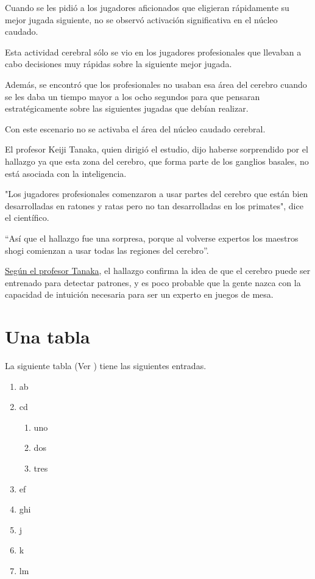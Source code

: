 \documentclass[12pt,a4paper]{article}
\begin{document}
Cuando se les pidió a los jugadores aficionados que eligieran rápidamente su mejor jugada siguiente, no se observó activación significativa en el núcleo caudado.

Esta actividad cerebral sólo se vio en los jugadores profesionales que llevaban a cabo decisiones muy rápidas sobre la siguiente mejor jugada.

Además, se encontró que los profesionales no usaban esa área del cerebro cuando se les daba un tiempo mayor a los ocho segundos para que pensaran estratégicamente sobre las siguientes jugadas que debían realizar.

Con este escenario no se activaba el área del núcleo caudado cerebral.

{\color{red} El profesor Keiji Tanaka, quien dirigió el estudio, dijo haberse sorprendido por el hallazgo ya que esta zona del cerebro, que forma parte de los ganglios basales, no está asociada con la inteligencia.}

"Los jugadores profesionales comenzaron a usar partes del cerebro que están bien desarrolladas en ratones y ratas pero no tan desarrolladas en los primates", dice el científico.

``Así que el hallazgo fue una sorpresa, porque al volverse expertos los maestros shogi comienzan a usar todas las regiones del cerebro''.

{\flushright\underline{Según el profesor Tanaka}, el hallazgo confirma la idea de que el cerebro puede ser entrenado para detectar patrones, y es poco probable que la gente nazca con la capacidad de intuición necesaria para ser un experto en juegos de mesa.}

\section{Una tabla}

La siguiente tabla (Ver \cite{Vo11}) tiene las siguientes entradas.

\begin{enumerate}
	\item ab
	\item cd
	\begin{enumerate}[$\bullet$]
		\item uno
		\item dos
		\item tres
	\end{enumerate}
	\item ef
	\item ghi
	\item j
	\item k
	\item lm
\end{enumerate}
\end{document}
